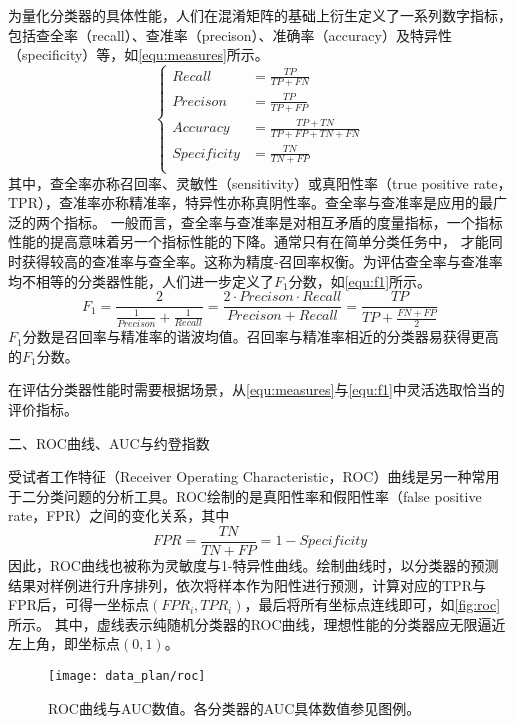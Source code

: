 为量化分类器的具体性能，人们在混淆矩阵的基础上衍生定义了一系列数字指标，包括查全率（recall）、查准率（precison）、准确率（accuracy）及特异性（specificity）等，如\autoref{equ:measures}所示。
\begin{equation}
      \label{equ:measures}
      \left \{
      \begin{aligned}
            Recall      &=\frac{TP}{TP+FN}         \\
            Precison    &=\frac{TP}{TP+FP}          \\
            Accuracy    &=\frac{TP+TN}{TP+FP+TN+FN} \\
            Specificity &=\frac{TN}{TN+FP}       \\
      \end{aligned}
      \right.
\end{equation}
其中，查全率亦称召回率、灵敏性（sensitivity）或真阳性率（true positive rate，TPR），查准率亦称精准率，特异性亦称真阴性率。查全率与查准率是应用的最广泛的两个指标\cite{Zhou2016,Aurélien2018}。
一般而言，查全率与查准率是对相互矛盾的度量指标，一个指标性能的提高意味着另一个指标性能的下降。通常只有在简单分类任务中，
才能同时获得较高的查准率与查全率。这称为精度-召回率权衡。为评估查全率与查准率均不相等的分类器性能，人们进一步定义了$F_1\text{分数}$，如\autoref{equ:f1}所示。
\begin{equation}
      \label{equ:f1}
      F_1=\frac{2}{\frac{1}{Precison}+\frac{1}{Recall}}=\frac{2\cdot Precison\cdot Recall}{Precison+Recall}=\frac{TP}{TP+\frac{FN+FP}{2}}
\end{equation}
$F_1\text{分数}$是召回率与精准率的谐波均值。召回率与精准率相近的分类器易获得更高的$F_1\text{分数}$。

在评估分类器性能时需要根据场景，从\autoref{equ:measures}与\autoref{equ:f1}中灵活选取恰当的评价指标。

二、ROC曲线、AUC与约登指数

受试者工作特征（Receiver Operating Characteristic，ROC）曲线是另一种常用于二分类问题的分析工具。ROC绘制的是真阳性率和假阳性率（false positive rate，FPR）之间的变化关系，其中
\begin{equation}
      \label{equ:fpr}
      FPR=\frac{TN}{TN+FP}=1-Specificity
\end{equation}
因此，ROC曲线也被称为灵敏度与1-特异性曲线。绘制曲线时，以分类器的预测结果对样例进行升序排列，依次将样本作为阳性进行预测，计算对应的TPR与FPR后，可得一坐标点$({FPR}_i,{TPR}_i)$，最后将所有坐标点连线即可，如\autoref{fig:roc}所示。
其中，虚线表示纯随机分类器的ROC曲线，理想性能的分类器应无限逼近左上角，即坐标点$(0,1)$。
\begin{figure}[htbp]
      \centering
      \texttt{[image: data\_plan/roc]}
      \caption[ROC曲线与AUC数值]{\label{fig:roc}ROC曲线与AUC数值。各分类器的AUC具体数值参见图例。}
\end{figure}

